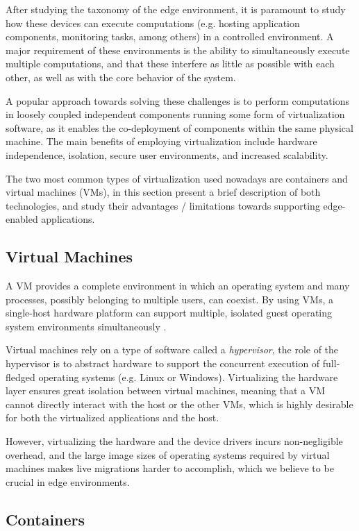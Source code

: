 
After studying the taxonomy of the edge environment, it is paramount to study how these devices can execute computations (e.g. hosting application components, monitoring tasks, among others) in a controlled environment. A major requirement of these environments is the ability to simultaneously execute multiple computations, and that these interfere as little as possible with each other, as well as with the core behavior of the system.

A popular approach towards solving these challenges is to perform computations in loosely coupled independent components running some form of virtualization software, as it enables the co-deployment of components within the same physical machine. The main benefits of employing virtualization include hardware independence, isolation, secure user environments, and increased scalability. 

The two most common types of virtualization used nowadays are containers and virtual machines (VMs), in this section present a brief description of both technologies, and study their advantages / limitations towards supporting edge-enabled applications.

\subsection{Virtual Machines}

A VM provides a complete environment in which an operating system and many processes, possibly belonging to multiple users, can coexist. By using VMs, a single-host hardware platform can support multiple, isolated guest operating system environments simultaneously \cite{1430629}. 

Virtual machines rely on a type of software called a \textit{hypervisor}, the role of the hypervisor is to abstract hardware to support the concurrent execution of full-fledged operating systems (e.g. Linux or Windows). Virtualizing the hardware layer ensures great isolation between virtual machines, meaning that a VM cannot directly interact with the host or the other VMs, which is highly desirable for both the virtualized applications and the host. 

However, virtualizing the hardware and the device drivers incurs non-negligible overhead, and the large image sizes of operating systems required by virtual machines makes live migrations harder to accomplish, which we believe to be crucial in edge environments.

\subsection{Containers}

